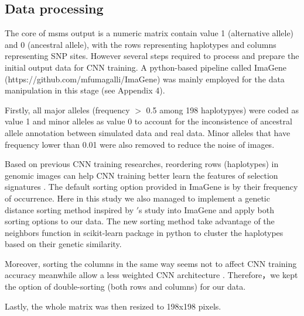 \documentclass[a4paper,12pt,oneside]{extarticle}
\begin{document}
\subsection{Data processing}
The core of msms output is a numeric matrix contain value 1 (alternative allele) and 0 (ancestral allele), with the rows representing haplotypes and columns representing SNP sites. However several steps required to process and prepare the initial output data for CNN training. A python-based pipeline called ImaGene (https://github.com/mfumagalli/ImaGene) was mainly employed for the data manipulation in this stage (see Appendix 4).
\par
Firstly, all major alleles (frequency $>$ 0.5 among 198 haplotypyes) were coded as value 1 and minor alleles as value 0 to account for the inconsistence of ancestral allele annotation between simulated data and real data. Minor alleles that have frequency lower than 0.01 were also removed to reduce the noise of images. 
\par
Based on previous CNN training researches, reordering rows (haplotypes) in genomic images can help CNN training better learn the features of selection signatures \cite{17}. The default sorting option provided in ImaGene is by their frequency of occurrence. Here in this study we also managed to implement a genetic distance sorting method inspired by \cite{17}$'$s study into ImaGene and apply both sorting options to our data. The new sorting method take advantage of the neighbors function in scikit-learn package \cite{44} in python to cluster the haplotypes based on their genetic similarity. 
\par
Moreover, sorting the columns in the same way seems not to affect CNN training accuracy meanwhile allow a less weighted CNN architecture . Therefore，we kept the option of double-sorting (both rows and columns) for our data.
\par
Lastly, the whole matrix was then resized to 198x198 pixels.
\end{document}
